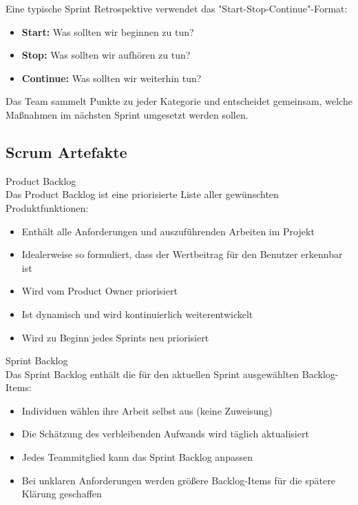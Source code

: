 \begin{example}
    Eine typische Sprint Retrospektive verwendet das "Start-Stop-Continue"-Format:
    \begin{itemize}
        \item \textbf{Start:} Was sollten wir beginnen zu tun?
        \item \textbf{Stop:} Was sollten wir aufhören zu tun?
        \item \textbf{Continue:} Was sollten wir weiterhin tun?
    \end{itemize}
    Das Team sammelt Punkte zu jeder Kategorie und entscheidet gemeinsam, welche Maßnahmen im nächsten Sprint umgesetzt werden sollen.
\end{example}

\subsection{Scrum Artefakte}

\begin{definition}{Product Backlog}\\
    Das Product Backlog ist eine priorisierte Liste aller gewünschten Produktfunktionen:
    \begin{itemize}
        \item Enthält alle Anforderungen und auszuführenden Arbeiten im Projekt
        \item Idealerweise so formuliert, dass der Wertbeitrag für den Benutzer erkennbar ist
        \item Wird vom Product Owner priorisiert
        \item Ist dynamisch und wird kontinuierlich weiterentwickelt
        \item Wird zu Beginn jedes Sprints neu priorisiert
    \end{itemize}
\end{definition}

\begin{definition}{Sprint Backlog}\\
    Das Sprint Backlog enthält die für den aktuellen Sprint ausgewählten Backlog-Items:
    \begin{itemize}
        \item Individuen wählen ihre Arbeit selbst aus (keine Zuweisung)
        \item Die Schätzung des verbleibenden Aufwands wird täglich aktualisiert
        \item Jedes Teammitglied kann das Sprint Backlog anpassen
        \item Bei unklaren Anforderungen werden größere Backlog-Items für die spätere Klärung geschaffen
    \end{itemize}
\end{definition}

